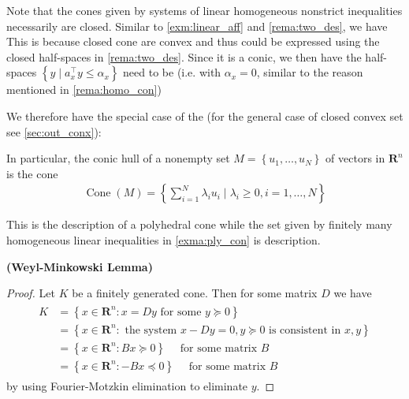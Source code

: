 \documentclass{article}
\newcommand{\bfs}[1]{\textbf{({#1}) }}
\begin{document}
\begin{rema}\label{rema:cone_outer} Note that the cones given by systems of linear homogeneous nonstrict inequalities necessarily are closed.
Similar to \cref{exm:linear_aff} and \cref{rema:two_des}, we have 
This is because closed cone are convex and thus could be expressed using the closed half-spaces in \cref{rema:two_des}. Since it is a conic, we then have the half-spaces $\left\{y \mid a_{x}^{\top} y \leq \alpha_{x}\right\}$ need to be  (i.e. with $\alpha_{x}=0$, similar to the reason mentioned in \cref{rema:homo_con})

We therefore have the special case of the  (for the general case of closed convex set see \cref{sec:out_conx}):


\end{rema}

\begin{exma}
 In particular, the conic hull of a nonempty  set $M=\left\{u_{1}, \ldots, u_{N}\right\}$ of vectors in $\mathbf{R}^{n}$ is the cone
\begin{align*}
\operatorname{Cone}(M)=\left\{\sum_{i=1}^{N} \lambda_{i} u_{i} \mid \lambda_{i} \geq 0, i=1, \ldots, N\right\}
\end{align*}
\end{exma}
\begin{rema}
This is the  description of a polyhedral cone while the set given by finitely many homogeneous linear inequalities in \cref{exma:ply_con} is  description.
\end{rema}
\begin{lema}{\bfs{Weyl-Minkowski Lemma}}

\end{lema}
\begin{proof}\color{ForestGreen}
Let $K$ be a finitely generated cone. Then for some matrix $D$ we have
\begin{align*}
\begin{aligned}
K &=\left\{x \in \mathbf{R}^{n}: x=D y \text { for some } y \succeq 0\right\} \\
&=\left\{x \in \mathbf{R}^{n}: \text { the system } x-D y=0, y \succeq 0 \text { is consistent in } x, y\right\} \\
&=\left\{x \in \mathbf{R}^{n}: B x \succeq 0\right\} \quad \text { for some matrix } B\\
&=\left\{x \in \mathbf{R}^{n}: -B x \preceq 0\right\} \quad \text { for some matrix } B
\end{aligned}
\end{align*}
by using Fourier-Motzkin elimination to eliminate $y$.
\end{proof}
\end{document}
